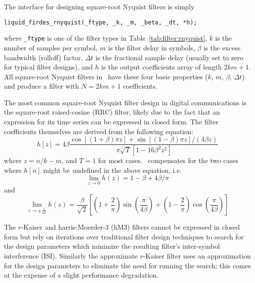 %
The interface for designing square-root Nyquist filters is simply
%
\begin{Verbatim}[fontsize=\small]
    liquid_firdes_rnyquist(_ftype, _k, _m, _beta, _dt, *h);
\end{Verbatim}
%
where {\tt \_ftype} is one of the filter types in
Table~\ref{tab:filter:rnyquist},
$k$ is the number of samples per symbol,
$m$ is the filter delay in symbols,
$\beta$ is the excess bandwidth (rolloff) factor,
$\Delta t$ is the fractional sample delay (usually set to zero for
  typical filter designs),
and $h$ is the output coefficients array of length $2km+1$.
All square-root Nyquist filters in \liquid\ have these four basic
properties ($k$, $m$, $\beta$, $\Delta t$) and produce a filter with
$N=2km+1$ coefficients.
%

The most common square-root Nyquist filter design in digital
communications is the square-root raised-cosine (RRC) filter,
likely due to the fact that an expression for its time series can be
expressed in closed form.
The filter coefficients themselves are derived from the following
equation:
%
\begin{equation}
\label{eqn:filter:rrcos}
    h\left[z\right] =
      4\beta \frac{ \cos\left[(1+\beta)\pi z\right] +
                    \sin\left[(1-\beta)\pi z\right] / (4\beta z) }
                  { \pi \sqrt{T}\left[ 1-16\beta^2z^2\right] }
\end{equation}
%
where $z=n/k-m$, and $T=1$ for most cases.
\liquid\ compensates for the two cases where $h[n]$ might be
undefined in the above equation, i.e.
%
\begin{equation}
\label{eqn:filter:rrcos:limit1}
    \mathop {\lim }\limits_{z \to 0 } h(z) = 1 - \beta + 4\beta/\pi
\end{equation}
%
and
%
\begin{equation}
\label{eqn:filter:rrcos:limit2}
    \mathop {\lim }\limits_{z \to \pm \frac{1}{4\beta} } h(z) =
        \frac{\beta}{\sqrt{2}}
        \left[
            \left(1 + \frac{2}{\pi}\right)\sin\left(\frac{\pi}{4\beta}\right) +
            \left(1 - \frac{2}{\pi}\right)\cos\left(\frac{\pi}{4\beta}\right)
        \right]
\end{equation}

The $r$-Kaiser and harris-Moerder-3 (hM3) filters cannot be expressed in
closed form but rely on iterations over traditional filter design
techniques to search for the design parameters which minimize the
resulting filter's inter-symbol interference (ISI).
Similarly the approximate $r$-Kaiser filter uses an approximation for
the design parameters to eliminate the need for running the search;
this comes at the expense of a slight performance degradation.

